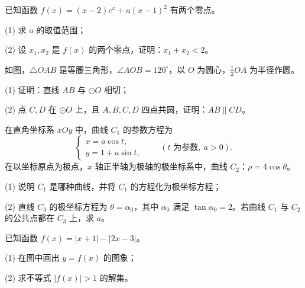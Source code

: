 \begin{question}
已知函数 $f(x)=(x-2)e^x+a(x-1)^2$ 有两个零点。

   (1) 求 $a$ 的取值范围；

   (2) 设 $x_1,x_2$ 是 $f(x)$ 的两个零点，证明：$x_1+x_2<2$。

\Needspace{0.4\textheight}
\end{question}
\begin{question}
如图，$\triangle OAB$ 是等腰三角形，$\angle AOB=120^\circ$，以 $O$ 为圆心，$\frac12 OA$ 为半径作圆。
\nopagebreak[4]
\begin{center}\end{center}
\nopagebreak[4]
   (1) 证明：直线 $AB$ 与 $\odot O$ 相切；

   (2) 点 $C,D$ 在 $\odot O$ 上，且 $A,B,C,D$ 四点共圆，证明：$AB\parallel CD$。

\end{question}
\begin{question}
在直角坐标系 $xOy$ 中，曲线 $C_1$ 的参数方程为
\nopagebreak[4]
   \[
   \begin{cases}
   x=a\cos t,\\
   y=1+a\sin t,
   \end{cases}\qquad (t\text{ 为参数},\ a>0).
   \]
   在以坐标原点为极点，$x$ 轴正半轴为极轴的极坐标系中，曲线 $C_2$：$\rho=4\cos\theta$。

   (1) 说明 $C_1$ 是哪种曲线，并将 $C_1$ 的方程化为极坐标方程；

   (2) 直线 $C_3$ 的极坐标方程为 $\theta=\alpha_0$，其中 $\alpha_0$ 满足 $\tan\alpha_0=2$。若曲线 $C_1$ 与 $C_2$ 的公共点都在 $C_3$ 上，求 $a$。

\Needspace{0.4\textheight}
\end{question}
\begin{question}
已知函数 $f(x)=|x+1|-|2x-3|$。

   (1) 在图中画出 $y=f(x)$ 的图象；

   (2) 求不等式 $|f(x)|>1$ 的解集。
\nopagebreak[4]
\begin{center}\end{center}
\nopagebreak[4]

\end{question}